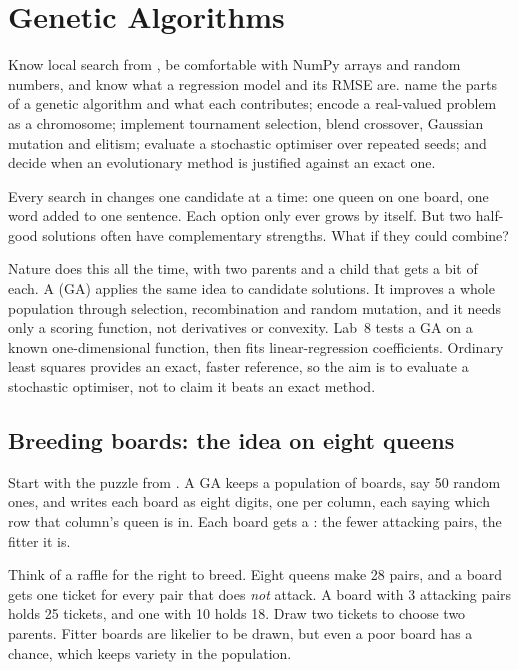 \chapter{Genetic Algorithms}
\label{ch:ga}

\chapterguide%
  {Know local search from , be comfortable with NumPy arrays and random numbers, and know what a regression model and its RMSE are.}
  {name the parts of a genetic algorithm and what each contributes; encode a real-valued problem as a chromosome; implement tournament selection, blend crossover, Gaussian mutation and elitism; evaluate a stochastic optimiser over repeated seeds; and decide when an evolutionary method is justified against an exact one.}

Every search in  changes one candidate at a time: one queen on one board, one word added to one sentence. Each option only ever grows by itself. But two half-good solutions often have complementary strengths. What if they could combine?

Nature does this all the time, with two parents and a child that gets a bit of each. A  (GA) applies the same idea to candidate solutions. It improves a whole population through selection, recombination and random mutation, and it needs only a scoring function, not derivatives or convexity. Lab~8 tests a GA on a known one-dimensional function, then fits linear-regression coefficients. Ordinary least squares provides an exact, faster reference, so the aim is to evaluate a stochastic optimiser, not to claim it beats an exact method.

\section{Breeding boards: the idea on eight queens}

Start with the puzzle from . A GA keeps a population of boards, say 50 random ones, and writes each board as eight digits, one per column, each saying which row that column's queen is in. Each board gets a : the fewer attacking pairs, the fitter it is.

\begin{analogy}
Think of a raffle for the right to breed. Eight queens make 28 pairs, and a board gets one ticket for every pair that does \emph{not} attack. A board with 3 attacking pairs holds 25 tickets, and one with 10 holds 18. Draw two tickets to choose two parents. Fitter boards are likelier to be drawn, but even a poor board has a chance, which keeps variety in the population.
\end{analogy}

